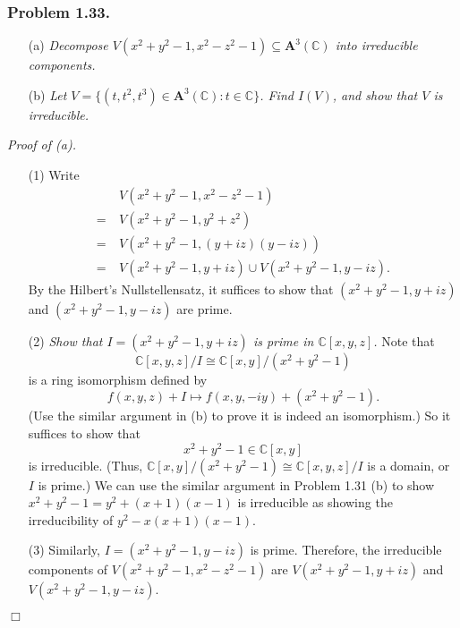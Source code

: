 \documentclass{article}
\begin{document}
\subsubsection*{Problem 1.33.}

\begin{enumerate}
\item[(a)]
  \emph{Decompose $V(x^2+y^2-1, x^2-z^2-1) \subseteq \mathbf{A}^3(\mathbb{C})$
  into irreducible components.}

\item[(b)]
  \emph{Let $V = \{(t,t^2,t^3) \in \mathbf{A}^3(\mathbb{C}) : t \in \mathbb{C} \}$.
  Find $I(V)$, and show that $V$ is irreducible.} \\
\end{enumerate}



\emph{Proof of (a).}
\begin{enumerate}
\item[(1)]
  Write
  \begin{align*}
    &\: V(x^2+y^2-1, x^2-z^2-1) \\
    =&\: V(x^2+y^2-1, y^2+z^2) \\
    =&\: V(x^2+y^2-1, (y + iz)(y - iz)) \\
    =&\: V(x^2+y^2-1, y + iz) \cup V(x^2+y^2-1, y - iz).
  \end{align*}
  By the Hilbert's Nullstellensatz,
  it suffices to show that $(x^2+y^2-1, y + iz)$ and $(x^2+y^2-1, y - iz)$ are prime.

\item[(2)]
  \emph{Show that $I = (x^2+y^2-1, y + iz)$ is prime in $\mathbb{C}[x,y,z]$.}
  Note that
  \[
    \mathbb{C}[x,y,z]/I \cong \mathbb{C}[x,y]/(x^2+y^2-1)
  \]
  is a ring isomorphism defined by
  \[
    f(x,y,z) + I \mapsto f(x,y,-iy) + (x^2+y^2-1).
  \]
  (Use the similar argument in (b) to prove it is indeed an isomorphism.)
  So it suffices to show that
  \[
    x^2+y^2-1 \in \mathbb{C}[x,y]
  \]
  is irreducible.
  (Thus, $\mathbb{C}[x,y]/(x^2+y^2-1) \cong \mathbb{C}[x,y,z]/I$ is a domain, or $I$ is prime.)
  We can use the similar argument in Problem 1.31 (b) to show
  $x^2+y^2-1 = y^2 + (x+1)(x-1)$ is irreducible
  as showing the irreducibility of $y^2 - x(x+1)(x-1)$.

\item[(3)]
  Similarly, $I = (x^2+y^2-1, y - iz)$ is prime.
  Therefore,
  the irreducible components of $V(x^2+y^2-1, x^2-z^2-1)$
  are $V(x^2+y^2-1, y + iz)$ and $V(x^2+y^2-1, y - iz)$.
\end{enumerate}
$\Box$ \\
\end{document}
